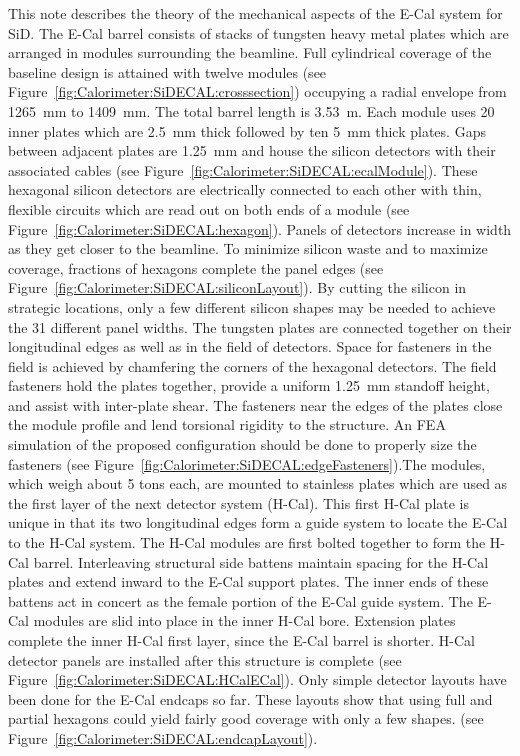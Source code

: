 This note describes the theory of the mechanical aspects of the E-Cal system for
SiD. The E-Cal barrel consists of stacks of tungsten heavy metal plates which
are arranged in modules surrounding the beamline. Full cylindrical coverage of
the baseline design is attained with twelve modules (see Figure~\ref{fig:Calorimeter:SiDECAL:crosssection}) occupying a
radial envelope from \SI{1265}{mm} to \SI{1409}{mm}. The total barrel length is \SI{3.53}{m}. Each
module uses 20 inner plates which are \SI{2.5}{mm} thick followed by ten \SI{5}{mm} thick
plates. Gaps between adjacent plates are \SI{1.25}{mm} and house the silicon detectors
with their associated cables (see Figure~\ref{fig:Calorimeter:SiDECAL:ecalModule}). These hexagonal silicon detectors
are electrically connected to each other with thin, flexible circuits which are
read out on both ends of a module (see Figure~\ref{fig:Calorimeter:SiDECAL:hexagon}). Panels of detectors increase
in width as they get closer to the beamline. To minimize silicon waste and to
maximize coverage, fractions of hexagons complete the panel edges (see Figure~\ref{fig:Calorimeter:SiDECAL:siliconLayout}). By cutting the silicon in strategic locations, only a few different silicon
shapes may be needed to achieve the 31 different panel widths. The tungsten
plates are connected together on their longitudinal edges as well as in the
field of detectors. Space for fasteners in the field is achieved by chamfering
the corners of the hexagonal detectors. The field fasteners hold the plates
together, provide a uniform \SI{1.25}{mm} standoff height, and assist with inter-plate
shear. The fasteners near the edges of the plates close the module profile and
lend torsional rigidity to the structure. An FEA simulation of the proposed
configuration should be done to properly size the fasteners (see Figure~\ref{fig:Calorimeter:SiDECAL:edgeFasteners}).The
modules, which weigh about 5 tons each, are mounted to stainless plates which
are used as the first layer of the next detector system (H-Cal). This first
H-Cal plate is unique in that its two longitudinal edges form a guide system to
locate the E-Cal to the H-Cal system. The H-Cal modules are first bolted
together to form the H-Cal barrel. Interleaving structural side battens maintain
spacing for the H-Cal plates and extend inward to the E-Cal support plates. The
inner ends of these battens act in concert as the female portion of the E-Cal
guide system. The E-Cal modules are slid into place in the inner H-Cal bore.
Extension plates complete the inner H-Cal first layer, since the E-Cal barrel is
shorter. H-Cal detector panels are installed after this structure is complete
(see Figure~\ref{fig:Calorimeter:SiDECAL:HCalECal}). Only simple detector layouts have been done for the E-Cal
endcaps so far. These layouts show that using full and partial hexagons could
yield fairly good coverage with only a few shapes. (see Figure~\ref{fig:Calorimeter:SiDECAL:endcapLayout}).

